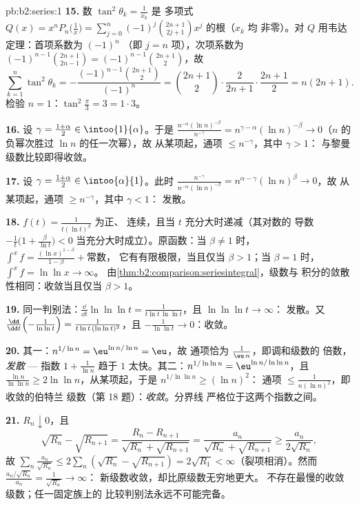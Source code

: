 \begin{solution}{pb:b2:series:1}
\textbf{15.} 数 $\tan^2\theta_k = \frac1{x_k}$ 是
多项式 $Q(x) = x^nP_n\bigl(\frac1x\bigr) =
\sum_{j=0}^n(-1)^j\binom{2n+1}{2j+1}x^j$ 的根（$x_k$ 均
非零）。对 $Q$ 用韦达定理：首项系数为 $(-1)^n$
（即 $j = n$ 项），次项系数为 $(-1)^{n-1}\binom{2n+1}{2n-1} =
(-1)^{n-1}\binom{2n+1}{2}$，故
\[
\sum_{k=1}^n\tan^2\theta_k =
-\frac{(-1)^{n-1}\binom{2n+1}2}{(-1)^n} = \binom{2n+1}2\cdot
\frac{2}{2n+1}\cdot\frac{2n+1}{2}
= n(2n+1).
\]
检验 $n = 1$：$\tan^2\frac\pi3 = 3 = 1\cdot3$。

\textbf{16.} 设 $\gamma = \frac{1+\alpha}2 \in
\intoo{1}{\alpha}$。于是 $\frac{n^{-\alpha}(\ln
n)^{-\beta}}{n^{-\gamma}} = n^{\gamma - \alpha}(\ln n)^{-\beta}
\to 0$（$n$ 的负幂次胜过 $\ln n$ 的任一次幂），故
从某项起，通项 $\leq n^{-\gamma}$，其中 $\gamma > 1$：
与黎曼级数比较即得收敛。

\textbf{17.} 设 $\gamma = \frac{1+\alpha}2 \in
\intoo{\alpha}{1}$。此时 $\frac{n^{-\gamma}}{n^{-\alpha}(\ln
n)^{-\beta}} = n^{\alpha-\gamma}(\ln n)^{\beta} \to 0$，故
从某项起，通项 $\geq n^{-\gamma}$，其中 $\gamma < 1$：
发散。

\textbf{18.} $f(t) = \frac1{t(\ln t)^\beta}$ 为正、
连续，且当 $t$ 充分大时递减（其对数的
导数 $-\frac1t\bigl(1 + \frac{\beta}{\ln t}\bigr) < 0$
当充分大时成立）。原函数：当 $\beta \neq 1$ 时，
$\int^x f = \frac{(\ln x)^{1-\beta}}{1-\beta} + \text{常数}$，
它有有限极限，当且仅当 $\beta > 1$；当 $\beta = 1$ 时，
$\int^x f = \ln\ln x \to \infty$。
由\cref{thm:b2:comparison:seriesintegral}，级数与
积分的敛散性相同：收敛当且仅当 $\beta > 1$。

\textbf{19.} 同一判别法：$\frac{\dd}{\dd t}\ln\ln\ln t =
\frac{1}{t\ln t\,\ln\ln t}$，且 $\ln\ln\ln t \to \infty$：
发散。又 $\frac{\dd}{\dd t}\Bigl(-\frac1{\ln\ln t}\Bigr)
= \frac{1}{t\ln t\,(\ln\ln t)^2}$，且 $-\frac1{\ln\ln t} \to
0$：收敛。

\textbf{20.} 其一：$n^{1/\ln n} = \eu^{\ln n/\ln n} = \eu$，故
通项恰为 $\frac{1}{\eu\,n}$，即调和级数的
倍数，\emph{发散} --- 指数 $1 +
\frac1{\ln n}$ 趋于 $1$ 太快。其二：$n^{1/\ln\ln n}
= \eu^{\ln n/\ln\ln n}$，且 $\frac{\ln n}{\ln\ln n} \geq
2\ln\ln n$，从某项起，于是 $n^{1/\ln\ln n} \geq (\ln n)^2$：
通项 $\leq \frac1{n(\ln n)^2}$，即收敛的伯特兰
级数（第 18 题）：\emph{收敛}。分界线
严格位于这两个指数之间。

\textbf{21.} $R_n \downarrow 0$，且
\[
\sqrt{R_n} - \sqrt{R_{n+1}} = \frac{R_n -
R_{n+1}}{\sqrt{R_n} + \sqrt{R_{n+1}}} =
\frac{a_n}{\sqrt{R_n} + \sqrt{R_{n+1}}} \geq
\frac{a_n}{2\sqrt{R_n}},
\]
故 $\sum_n \frac{a_n}{\sqrt{R_n}} \leq 2\sum_n(\sqrt{R_n} -
\sqrt{R_{n+1}}) = 2\sqrt{R_1} < \infty$（裂项相消）。然而
$\frac{a_n/\sqrt{R_n}}{a_n} = \frac1{\sqrt{R_n}} \to \infty$：
新级数收敛，却比原级数无穷地更大。
不存在最慢的收敛级数；任一固定族上的
比较判别法永远不可能完备。


\end{solution}
